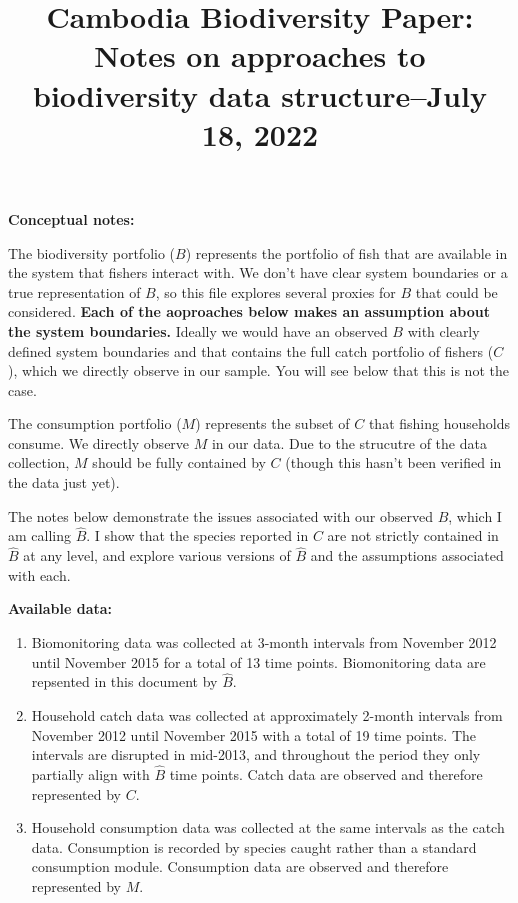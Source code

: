 \documentclass[
]{article}
\title{Cambodia Biodiversity Paper: Notes on approaches to biodiversity
data structure--July 18, 2022}
\author{}
\date{\vspace{-2.5em}}
\begin{document}
\maketitle

\textbf{Conceptual notes:}

The biodiversity portfolio (\(B\)) represents the portfolio of fish that
are available in the system that fishers interact with. We don't have
clear system boundaries or a true representation of \(B\), so this file
explores several proxies for \(B\) that could be considered.
\textbf{Each of the aoproaches below makes an assumption about the
system boundaries.} Ideally we would have an observed \(B\) with clearly
defined system boundaries and that contains the full catch portfolio of
fishers (\(C\)), which we directly observe in our sample. You will see
below that this is not the case.

The consumption portfolio (\(M\)) represents the subset of \(C\) that
fishing households consume. We directly observe \(M\) in our data. Due
to the strucutre of the data collection, \(M\) should be fully contained
by \(C\) (though this hasn't been verified in the data just yet).

The notes below demonstrate the issues associated with our observed
\(B\), which I am calling \(\hat{B}\). I show that the species reported
in \(C\) are not strictly contained in \(\hat{B}\) at any level, and
explore various versions of \(\hat{B}\) and the assumptions associated
with each.

\textbf{Available data:}

\begin{enumerate}
\def\labelenumi{\arabic{enumi}.}
\item
  Biomonitoring data was collected at 3-month intervals from November
  2012 until November 2015 for a total of 13 time points. Biomonitoring
  data are repsented in this document by \(\hat{B}\).
\item
  Household catch data was collected at approximately 2-month intervals
  from November 2012 until November 2015 with a total of 19 time points.
  The intervals are disrupted in mid-2013, and throughout the period
  they only partially align with \(\hat{B}\) time points. Catch data are
  observed and therefore represented by \(C\).
\item
  Household consumption data was collected at the same intervals as the
  catch data. Consumption is recorded by species caught rather than a
  standard consumption module. Consumption data are observed and
  therefore represented by \(M\).
\end{enumerate}
\end{document}
